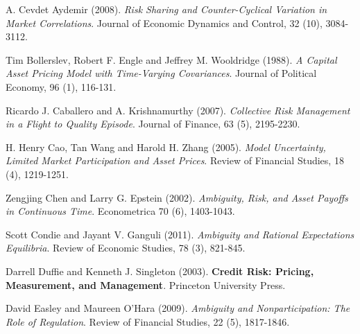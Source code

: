 \documentclass[10.0pt]{article}
\begin{document}
\begin{thebibliography}{99}

 A. Cevdet Aydemir (2008). {\it Risk Sharing and Counter-Cyclical Variation in Market Correlations}. Journal of Economic Dynamics and Control, 32 (10), 3084-3112.



 Tim Bollerslev, Robert F. Engle and Jeffrey M. Wooldridge (1988). {\it A Capital Asset Pricing Model with Time-Varying Covariances}. Journal of Political Economy, 96 (1), 116-131.

 Ricardo J. Caballero and A. Krishnamurthy (2007). {\it Collective Risk Management in a Flight to Quality Episode}. Journal of Finance, 63 (5), 2195-2230.



 H. Henry Cao, Tan Wang and Harold H. Zhang (2005). {\it Model Uncertainty, Limited Market Participation and Asset Prices}. Review of Financial Studies, 18 (4), 1219-1251.

 Zengjing Chen and Larry G. Epstein (2002). {\it Ambiguity, Risk, and Asset Payoffs in Continuous Time}. Econometrica 70 (6), 1403-1043.

 Scott Condie and Jayant V. Ganguli (2011). {\it Ambiguity and Rational Expectations Equilibria}. Review of Economic Studies, 78 (3), 821-845.


 Darrell Duffie and Kenneth J. Singleton (2003). {\bf Credit Risk: Pricing, Measurement, and Management}. Princeton University Press.

 David Easley and Maureen O'Hara (2009). {\it Ambiguity and Nonparticipation: The Role of Regulation}. Review of Financial Studies, 22 (5), 1817-1846.


\end{thebibliography}
\end{document}
